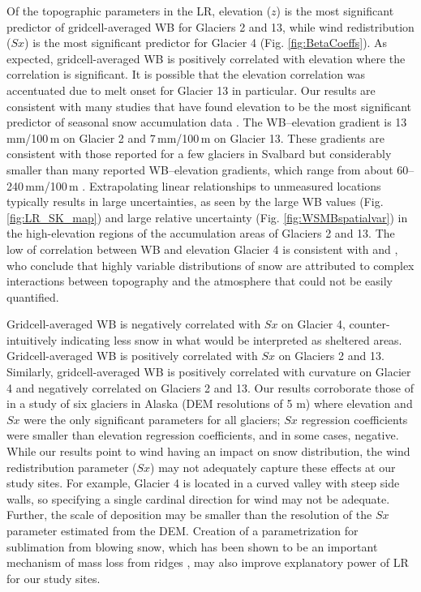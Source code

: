 \documentclass[twocolumn, letterpaper]{igs}
\begin{document}
Of the topographic parameters in the LR, elevation ($z$) is the most significant predictor of gridcell-averaged WB for Glaciers 2 and 13, while wind redistribution ($Sx$) is the most significant predictor for Glacier 4 (Fig. \ref{fig:BetaCoeffs}). As expected, gridcell-averaged WB is positively correlated with elevation where the correlation is significant. It is possible that the elevation correlation was accentuated due to melt onset for Glacier 13 in particular. Our results are consistent with many studies that have found elevation to be the most significant predictor of seasonal snow accumulation data \citep[e.g.][]{Machguth2006, Grunewald2014, McGrath2015}. The WB--elevation gradient is 13\,mm/100\,m on Glacier 2 and 7\,mm/100\,m on Glacier 13. These gradients are consistent with those reported for a few glaciers in Svalbard \citep{Winther1998} but considerably smaller than many reported WB--elevation gradients, which range from about 60--240\,mm/100\,m \citep[e.g.][]{Hagen1990,Tveit1996,Winther1998}. Extrapolating linear relationships to unmeasured locations typically results in large uncertainties, as seen by the large WB values (Fig. \ref{fig:LR_SK_map}) and large relative uncertainty (Fig. \ref{fig:WSMBspatialvar}) in the high-elevation regions of the accumulation areas of Glaciers 2 and 13. The low of correlation between WB and elevation Glacier 4 is consistent with \cite{Grabiec2011} and \cite{Lopez2011}, who conclude that highly variable distributions of snow are attributed to complex interactions between topography and the atmosphere that could not be easily quantified. 

Gridcell-averaged WB is negatively correlated with $Sx$ on Glacier 4, counter-intuitively indicating less snow in what would be interpreted as sheltered areas. Gridcell-averaged WB is positively correlated with $Sx$ on Glaciers 2 and 13. Similarly, gridcell-averaged WB is positively correlated with curvature on Glacier 4 and negatively correlated on Glaciers 2 and 13. Our results corroborate those of \cite{McGrath2015} in a study of six glaciers in Alaska (DEM resolutions of 5 m) where elevation and $Sx$ were the only significant parameters for all glaciers; $Sx$ regression coefficients were smaller than elevation regression coefficients, and in some cases, negative. While our results point to wind having an impact on snow distribution, the wind redistribution parameter ($Sx$) may not adequately capture these effects at our study sites. For example, Glacier 4 is located in a curved valley with steep side walls, so specifying a single cardinal direction for wind may not be adequate. Further, the scale of deposition may be smaller than the resolution of the $Sx$ parameter estimated from the DEM. Creation of a parametrization for sublimation from blowing snow, which has been shown to be an important mechanism of mass loss from ridges \citep[e.g.][]{Musselman2015}, may also improve explanatory power of LR for our study sites.
\end{document}
